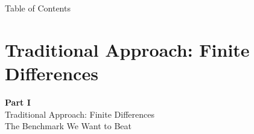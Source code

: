 \documentclass[aspectratio=169,11pt]{beamer}
\begin{document}
\begin{frame}{Table of Contents}
\tableofcontents[hideallsubsections]
\end{frame}


\section{Traditional Approach: Finite Differences}

\begin{frame}{}
\vfill
\begin{center}
{\Huge \textcolor{uzhblue}{\textbf{Part I}}}\\[12pt]
{\LARGE Traditional Approach: Finite Differences}\\[6pt]
{\large The Benchmark We Want to Beat}
\end{center}
\vfill
\end{frame}
\end{document}
